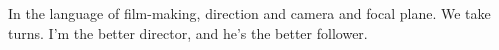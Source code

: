 

In the language of film-making, direction and camera and focal plane.
We take turns.  I'm the better director, and he's the better follower.

\bye
